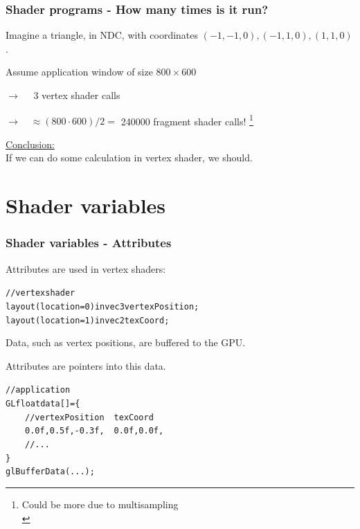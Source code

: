 \documentclass{beamer}
\begin{document}
%
%
%
\begin{frame}
\frametitle{Shader programs - How many times is it run?}

Imagine a triangle, in NDC, with coordinates $(-1,-1,0), (-1,1,0), (1,1,0)$.

Assume application window of size $800 \times 600$

$\rightarrow \quad$ 3 vertex shader calls

$\rightarrow \quad \approx (800\cdot 600) / 2 = $ 240000 fragment shader calls!
\footnote{Could be more due to multisampling\\}\\\vspace{5mm}

\underline{Conclusion:}\\\vspace{1mm}
If we can do some calculation in vertex shader, we should.
\end{frame}


%
%
%
\section{Shader variables}

\begin{frame}
\frametitle{Shader variables - Attributes}

Attributes are used in vertex shaders:

\begin{alltt}\footnotesize
// vertex shader\\
layout (location = 0) in vec3 vertexPosition;\\
layout (location = 1) in vec2 texCoord;
\end{alltt}

Data, such as vertex positions, are buffered to the GPU.

Attributes are pointers into this data.

\begin{alltt}\footnotesize
// application\\
GLfloat data[] = \{\\
\ensuremath{\qquad}// vertexPosition \ensuremath{\quad} texCoord\\
\ensuremath{\qquad}0.0f, 0.5f, -0.3f,\ensuremath{\quad}    0.0f, 0.0f,\\
\ensuremath{\qquad}//  ...\\
\}\\
glBufferData( ... );
\end{alltt}

\end{frame}
\end{document}
